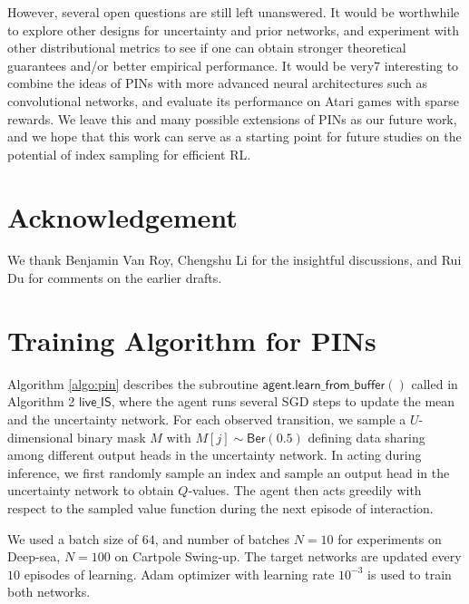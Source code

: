 \documentclass[letterpaper]{article} %
\theoremstyle{definition}
\begin{document}
However, several open questions are still left unanswered. It would be worthwhile to explore other designs for uncertainty and prior networks, and experiment with other distributional metrics to see if one can obtain stronger theoretical guarantees and/or better empirical performance. It would be very7 interesting to combine the ideas of PINs with more advanced neural architectures such as convolutional networks, and evaluate its performance on Atari games with sparse rewards. We leave this and many possible extensions of PINs as our future work, and we hope that this work can serve as a starting point for future studies on the potential of index sampling for efficient RL.

\section{Acknowledgement}
We thank Benjamin Van Roy, Chengshu Li for the insightful discussions, and Rui Du for comments on the earlier drafts.

\medskip




\newpage
\appendix 
\onecolumn

\section{Training Algorithm for PINs}

Algorithm \ref{algo:pin} describes the subroutine $\mathsf{agent.learn\_from\_buffer()}$ called in Algorithm 2 $\mathsf{live\_IS}$, where the agent runs several SGD steps to update the mean and the uncertainty network. For each observed transition, we sample a $U$-dimensional binary mask $M$ with $M[j] \sim \mathsf{Ber}(0.5)$ defining data sharing among different output heads in the uncertainty network. In acting during inference, we first randomly sample an index and sample an output head in the uncertainty network to obtain $Q$-values. The agent then acts greedily with respect to the sampled value function during the next episode of interaction.                    

We used a batch size of $64$, and number of batches $N = 10$ for experiments on Deep-sea, $N = 100$ on Cartpole Swing-up. The target networks are updated every $10$ episodes of learning. Adam optimizer with learning rate $10^{-3}$ is used to train both networks. 
\end{document}
